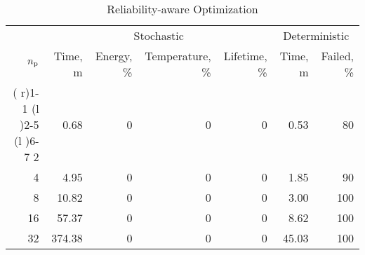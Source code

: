 \begin{table*}[t]
  \centering
  \caption{Reliability-aware Optimization}
  \vspace{-0.5em}
  \begin{tabular*}{1\linewidth}{rrrrrrr}
    \toprule
    & \multicolumn{4}{c}{Stochastic} & \multicolumn{2}{c}{Deterministic} \\
    ${n_\text{p}}$ & Time, m & Energy, \% & Temperature, \% & Lifetime, \% &  Time, m & Failed, \% \\
    \cmidrule( r){1-1}
    \cmidrule(l ){2-5}
    \cmidrule(l ){6-7}
     2 &   0.68 & 0 & 0 & 0 &  0.53 &  80 \\
     4 &   4.95 & 0 & 0 & 0 &  1.85 &  90 \\
     8 &  10.82 & 0 & 0 & 0 &  3.00 & 100 \\
    16 &  57.37 & 0 & 0 & 0 &  8.62 & 100 \\
    32 & 374.38 & 0 & 0 & 0 & 45.03 & 100 \\
    \bottomrule
  \end{tabular*}
\end{table*}
